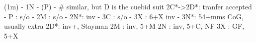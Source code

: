 (1m) - 1N - (P) - 
# similar, but D is the cuebid suit
2C*->2D*: tranfer accepted
        - P  : s/o
        - 2M : s/o
        - 2N*: inv
        - 3C : s/o
        - 3X : 6+X inv
        - 3N*: 54+mms CoG, usually extra
2D*: inv+, Stayman
2M : inv, 5+M
2N : inv, 5+C, NF
3X : GF, 5+X